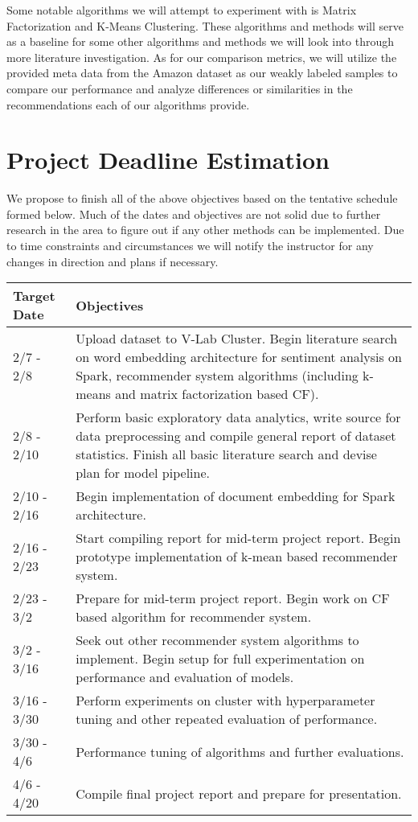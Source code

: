 \documentclass[a4paper, 11pt]{article}
\begin{document}
Some notable algorithms we will attempt to experiment with is Matrix Factorization and K-Means Clustering. These algorithms and methods will serve as a baseline for some other algorithms and methods we will look into through more literature investigation. As for our comparison metrics, we will utilize the provided meta data from the Amazon dataset as our weakly labeled samples to compare our performance and analyze differences or similarities in the recommendations each of our algorithms provide.

\section*{Project Deadline Estimation}
We propose to finish all of the above objectives based on the tentative schedule formed below. Much of the dates and objectives are not solid due to further research in the area to figure out if any other methods can be implemented. Due to time constraints and circumstances we will notify the instructor for any changes in direction and plans if necessary. \\


\begin{tabularx}{\linewidth}{|X|X|}
  \hline
    Target Date & Objectives \\ \hline
    2/7 - 2/8 & Upload dataset to V-Lab Cluster. Begin literature search on word embedding architecture for sentiment analysis on Spark, recommender system algorithms (including k-means and matrix factorization based CF). \\ \hline
    2/8 - 2/10 & Perform basic exploratory data analytics, write source for data preprocessing and compile general report of dataset statistics. Finish all basic literature search and devise plan for model pipeline. \\ \hline
    2/10 - 2/16 & Begin implementation of document embedding for Spark architecture. \\ \hline
    2/16 - 2/23 & Start compiling report for mid-term project report. Begin prototype implementation of k-mean based recommender system. \\ \hline
    2/23 - 3/2 & Prepare for mid-term project report. Begin work on CF based algorithm for recommender system. \\ \hline
    3/2 - 3/16 & Seek out other recommender system algorithms to implement. Begin setup for full experimentation on performance and evaluation of models. \\ \hline
    3/16 - 3/30 & Perform experiments on cluster with hyperparameter tuning and other repeated evaluation of performance. \\ \hline
    3/30 - 4/6 & Performance tuning of algorithms and further evaluations. \\ \hline
    4/6 - 4/20 & Compile final project report and prepare for presentation. \\ \hline
\end{tabularx}
\end{document}
